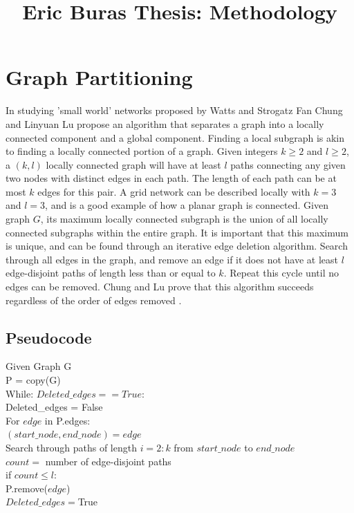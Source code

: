 \documentclass{article}
\begin{document}
\title{Eric Buras Thesis: Methodology}

\maketitle

\section{Graph Partitioning}
In studying 'small world' networks proposed by Watts and Strogatz \cite{Watts:1998} Fan Chung and Linyuan Lu propose an algorithm that separates a graph into a locally connected component and a global component. Finding a local subgraph is akin to finding a locally connected portion of a graph. Given integers $k \geq 2$ and $l \geq 2$, a $(k,l)$ locally connected graph will have at least $l$ paths connecting any given two nodes with distinct edges in each path. The length of each path can be at most $k$ edges for this pair. A grid network can be described locally with $k=3$ and $l=3$, and is a good example of how a planar graph is connected. Given graph $G$, its maximum locally connected subgraph is the union of all locally connected subgraphs within the entire graph. It is important that this maximum is unique, and can be found through an iterative edge deletion algorithm\cite{Chung:2004}. Search through all edges in the graph, and remove an edge if it does not have at least $l$ edge-disjoint paths of length less than or equal to $k$. Repeat this cycle until no edges can be removed. Chung and Lu prove that this algorithm succeeds regardless of the order of edges removed \cite{Chung:2004}. 

\subsection{Pseudocode}
Given Graph G\\
P = copy(G)\\
While: $Deleted\_edges == True$:\\
\indent Deleted\_edges = False\\
\indent For $edge$ in P.edges:\\
\indent \indent $(start\_node, end\_node) = edge$\\
\indent \indent Search through paths of length $i=2:k$ from $start\_node$ to $end\_node$\\
\indent \indent $count =$  number of edge-disjoint paths\\
\indent \indent if $count \leq l$:\\
\indent \indent \indent P.remove($edge$)\\
\indent \indent \indent $Deleted\_edges = $True\\
	
\end{document}
